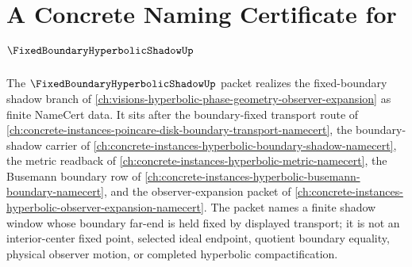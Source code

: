 \chapter{A Concrete Naming Certificate for $\FixedBoundaryHyperbolicShadowUp$}
\label{ch:concrete-instances-fixed-boundary-hyperbolic-shadow-namecert}

The $\FixedBoundaryHyperbolicShadowUp$ packet realizes the fixed-boundary shadow branch of \autoref{ch:visions-hyperbolic-phase-geometry-observer-expansion} as finite NameCert data. It sits after the boundary-fixed transport route of \autoref{ch:concrete-instances-poincare-disk-boundary-transport-namecert}, the boundary-shadow carrier of \autoref{ch:concrete-instances-hyperbolic-boundary-shadow-namecert}, the metric readback of \autoref{ch:concrete-instances-hyperbolic-metric-namecert}, the Busemann boundary row of \autoref{ch:concrete-instances-hyperbolic-busemann-boundary-namecert}, and the observer-expansion packet of \autoref{ch:concrete-instances-hyperbolic-observer-expansion-namecert}. The packet names a finite shadow window whose boundary far-end is held fixed by displayed transport; it is not an interior-center fixed point, selected ideal endpoint, quotient boundary equality, physical observer motion, or completed hyperbolic compactification.

